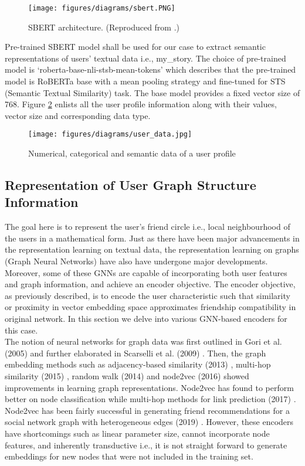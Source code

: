 \documentclass{kththesis}
\begin{document}
\begin{figure}[h!]
\centering
\texttt{[image: figures/diagrams/sbert.PNG]}
\caption{SBERT architecture. (Reproduced from \cite{sbert}.)}
\label{fig:sbert}
\end{figure}

\newpage
Pre-trained SBERT model shall be used for our case to extract semantic representations of users' textual data i.e., my\_story. The choice of pre-trained model is ‘roberta-base-nli-stsb-mean-tokens’ which describes that the pre-trained model is RoBERTa base with a mean pooling strategy and fine-tuned for STS (Semantic Textual Similarity) task. The base model provides a fixed vector size of 768. Figure \ref{fig:user_data} enlists all the user profile information along with their values, vector size and corresponding data type. \\

\begin{figure}[h!]
\centering
\texttt{[image: figures/diagrams/user\_data.jpg]}
\caption{Numerical, categorical and semantic data of a user profile}
\label{fig:user_data}
\end{figure}
\subsection{Representation of User Graph Structure Information}
The goal here is to represent the user's friend circle i.e., local neighbourhood of the users in a mathematical form. Just as there have been major advancements in the representation learning on textual data, the representation learning on graphs (Graph Neural Networks) have also have undergone major developments. Moreover, some of these GNNs are capable of incorporating both user features and graph information, and achieve an encoder objective. The encoder objective, as previously described, is to encode the user characteristic such that similarity or proximity in vector embedding space approximates friendship compatibility in original network. In this section we delve into various GNN-based encoders for this case. \\

The notion of neural networks for graph data was first outlined in Gori et al. (2005) \cite{gori} and further elaborated in Scarselli et al. (2009) \cite{scar}. Then, the graph embedding methods such as adjacency-based similarity (2013) \cite{ahd}, multi-hop similarity (2015) \cite{cao}, random walk (2014) \cite{rw} and node2vec (2016) \cite{n2v} showed improvements in learning graph representations. Node2vec has found to perform better on node classification while multi-hop methods for link prediction (2017) \cite{goy}. Node2vec has been fairly successful in generating friend recommendations for a social network graph with heterogeneous edges (2019) \cite{verma}.  However, these encoders have shortcomings such as linear parameter size, cannot incorporate node features, and inherently transductive i.e., it is not straight forward to generate embeddings for new nodes that were not included in the training set.\\
\end{document}
